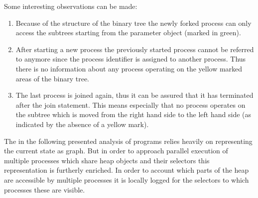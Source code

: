 	Some interesting observations can be made:
	\begin{enumerate}
		\item Because of the structure of the binary tree the newly forked
			process can only access the subtrees starting from the parameter
			object (marked in green).
		\item After starting a new process the previously started process cannot
			be referred to anymore since the process identifier is assigned to
			another process. Thus there is no information about any process
			operating on the yellow marked areas of the binary tree.
		\item The last process is joined again, thus it can be assured that it
			has terminated after the join statement. This means especially that
			no process operates on the subtree which is moved from the right hand
			side to the left hand side (as indicated by the absence of a yellow
			mark).
	\end{enumerate}
	The in the following presented analysis of programs relies heavily on
	representing the current state as graph. But in order to approach parallel
	execution of multiple processes which share heap objects and their selectors
	this representation is furtherly enriched. In order to account which parts
	of the heap are accessible by multiple processes it is locally logged for
	the selectors to which processes these are visible.
